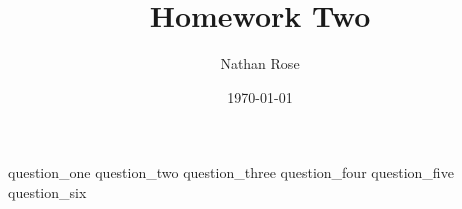 \documentclass[11pt]{article}
\title{Homework Two}
\author{Nathan Rose}
\date{\today}
\begin{document}
\maketitle
\begin{enumerate}
  {question_one}
  {question_two}
  {question_three}
  {question_four}
  {question_five}
  {question_six}
\end{enumerate}
\end{document}
